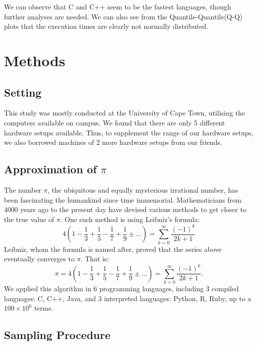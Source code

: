 \documentclass[12pt,halfline,a4paper,]{ouparticle}
\begin{document}
We can observe that C and C++ seem to be the fastest languages, though
further analyses are needed. We can also see from the
Quantile-Quantile(Q-Q) plots that the execution times are clearly not
normally distributed. \newpage

\section{Methods}\label{methods}

\subsection{Setting}\label{setting}

This study was mostly conducted at the University of Cape Town,
utilising the computers available on campus. We found that there are
only 5 different hardware setups available. Thus, to supplement the
range of our hardware setups, we also borrowed machines of 2 more
hardware setups from our friends.

\subsection{\texorpdfstring{Approximation of
\(\pi\)}{Approximation of \textbackslash pi}}\label{approximation-of-pi}

The number \(\pi\), the ubiquitous and equally mysterious irrational
number, has been fascinating the humankind since time immemorial.
Mathematicians from 4000 years ago to the present day have devised
various methods to get closer to the true value of \(\pi\). One such
method is using Leibniz's formula: \[
4 \left( 1 - \frac{1}{3} + \frac{1}{5} - \frac{1}{7} + \frac{1}{9} ±... \right) = \sum_{k=0}^{\infty}\frac{(-1)^k}{2k+1}
\] Leibniz, whom the formula is named after, proved that the series
above eventually converges to \(\pi\). That is: \[
\pi = 4 \left( 1 - \frac{1}{3} + \frac{1}{5} - \frac{1}{7} + \frac{1}{9} ±... \right) = \sum_{k=0}^{\infty}\frac{(-1)^k}{2k+1}.
\] We applied this algorithm in 6 programming languages, including 3
compiled languages: C, C++, Java, and 3 interpreted languages: Python,
R, Ruby, up to a \(100 \times 10^6\) terms.

\subsection{Sampling Procedure}\label{sampling-procedure}
\end{document}
